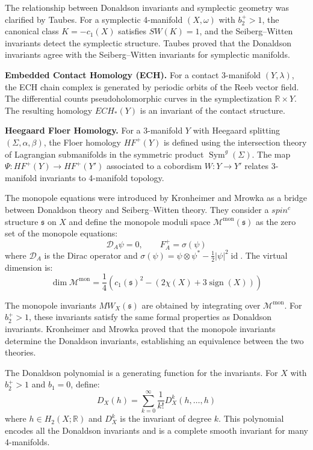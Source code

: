 The relationship between Donaldson invariants and symplectic geometry was clarified by Taubes. For a symplectic 4-manifold $(X, \omega)$ with $b_2^+ > 1$, the canonical class $K = -c_1(X)$ satisfies $SW(K) = 1$, and the Seiberg--Witten invariants detect the symplectic structure. Taubes proved that the Donaldson invariants agree with the Seiberg--Witten invariants for symplectic manifolds.

\textbf{Embedded Contact Homology (ECH).} For a contact 3-manifold $(Y, \lambda)$, the ECH chain complex is generated by periodic orbits of the Reeb vector field. The differential counts pseudoholomorphic curves in the symplectization $\mathbb{R} \times Y$. The resulting homology $ECH_*(Y)$ is an invariant of the contact structure.

\textbf{Heegaard Floer Homology.} For a 3-manifold $Y$ with Heegaard splitting $(\Sigma, \alpha, \beta)$, the Floer homology $HF^+(Y)$ is defined using the intersection theory of Lagrangian submanifolds in the symmetric product $\operatorname{Sym}^g(\Sigma)$. The map $\Psi: HF^+(Y) \to HF^+(Y')$ associated to a cobordism $W: Y \to Y'$ relates 3-manifold invariants to 4-manifold topology.

The monopole equations were introduced by Kronheimer and Mrowka as a bridge between Donaldson theory and Seiberg--Witten theory. They consider a $spin^c$ structure $\mathfrak{s}$ on $X$ and define the monopole moduli space $\mathcal{M}^{\text{mon}}(\mathfrak{s})$ as the zero set of the monopole equations:
\[
\mathcal{D}_A \psi = 0, \qquad F_A^+ = \sigma(\psi)
\]
where $\mathcal{D}_A$ is the Dirac operator and $\sigma(\psi) = \psi \otimes \psi^* - \frac{1}{2}|\psi|^2 \operatorname{id}$. The virtual dimension is:
\[
\dim \mathcal{M}^{\text{mon}} = \frac{1}{4}(c_1(\mathfrak{s})^2 - (2\chi(X) + 3\operatorname{sign}(X)))
\]

The monopole invariants $MW_X(\mathfrak{s})$ are obtained by integrating over $\mathcal{M}^{\text{mon}}$. For $b_2^+ > 1$, these invariants satisfy the same formal properties as Donaldson invariants. Kronheimer and Mrowka proved that the monopole invariants determine the Donaldson invariants, establishing an equivalence between the two theories.

The Donaldson polynomial is a generating function for the invariants. For $X$ with $b_2^+ > 1$ and $b_1 = 0$, define:
\[
D_X(h) = \sum_{k=0}^{\infty} \frac{1}{k!} D_X^k(h, \ldots, h)
\]
where $h \in H_2(X;\mathbb{R})$ and $D_X^k$ is the invariant of degree $k$. This polynomial encodes all the Donaldson invariants and is a complete smooth invariant for many 4-manifolds.

